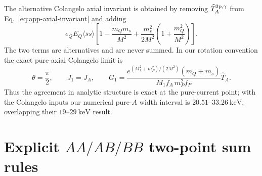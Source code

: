\documentclass[11pt]{article}
\newcommand{\keV}{\mathrm{keV}}
\newcommand{\ssbar}{\langle\bar s s\rangle}
\begin{document}
\begin{table}[htbp]
 \centering
 \caption{Separation of the transition and two-point condensate prescriptions.}
 \label{tab:app-local-schemes}
\end{table}

The alternative Colangelo axial invariant is obtained by removing
$\widehat T_A^{\rm 3p,\gamma}$ from Eq.~\eqref{eq:app-axial-invariant} and adding
\begin{equation}
 e_QE_Q\ssbar\left[1-\frac{m_Qm_s}{M^2}
 +\frac{m_s^2}{2M^2}\left(1+\frac{m_Q^2}{M^2}\right)\right].
 \label{eq:app-colangelo-local}
\end{equation}
The two terms are alternatives and are never summed.  In our rotation
convention the exact pure-axial Colangelo limit is
\begin{equation}
 \theta=\frac{\pi}{2},\qquad J_1=J_A,\qquad
 G_1=\frac{e^{(M_1^2+m_P^2)/(2M^2)}(m_Q+m_s)}
 {M_1f_A\,m_P^2f_P}\widehat T_A .
 \label{eq:app-colangelo-limit}
\end{equation}
Thus the agreement in analytic structure is exact at the pure-current point;
with the Colangelo inputs our numerical pure-$A$ width interval is
$20.51$--$33.26~\keV$, overlapping their $19$--$29~\keV$ result.

\section{Explicit \texorpdfstring{$AA/AB/BB$}{AA/AB/BB} two-point sum rules}
\label{app:two-point}
\end{document}
